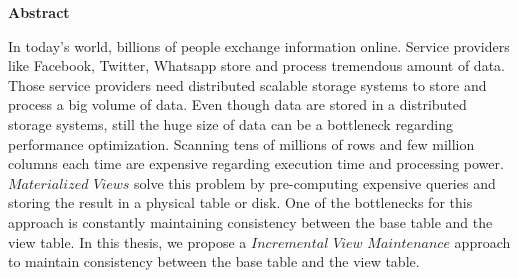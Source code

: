 

\clearemptydoublepage
{}
{}	





\vspace*{2cm}
\begin{center}
{\Large \bf Abstract}
\end{center}
\vspace{1cm}



In today's world, billions of people exchange information online. Service providers like Facebook, Twitter, Whatsapp store and process tremendous amount of data. Those service providers need distributed scalable storage systems to store and process a big volume of data. Even though data are stored in a distributed storage systems, still the huge size of data can be a bottleneck regarding performance optimization. Scanning tens of millions of rows and few million columns each time are expensive regarding execution time and processing power. $Materialized$ $Views$ solve this problem by pre-computing expensive queries and storing the result in a physical table or disk. One of the bottlenecks for this approach is constantly maintaining consistency between the base table and the view table. In this thesis, we propose a $Incremental$ $View$ $Maintenance$ approach to maintain consistency between the base table and the view table.